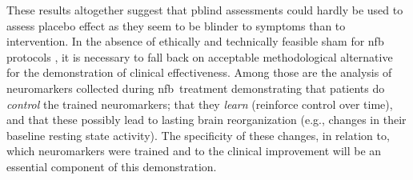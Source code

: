 These results altogether suggest that \gls{pblind} assessments could hardly be used to assess placebo effect as they seem to be blinder 
to symptoms than to intervention. In the absence of ethically \citep{Holtmann2014} and technically \citep{Birbaumer1991} feasible sham 
for \gls{nfb} protocols \citep{World-Medical-Association2000}, it is necessary to fall back on acceptable methodological alternative for 
the demonstration of clinical effectiveness. Among those are the analysis of neuromarkers collected during \gls{nfb} treatment demonstrating 
that patients do \emph{control} the trained neuromarkers; that they \emph{learn} (reinforce control over time), and that these possibly 
lead to lasting brain reorganization (e.g., changes in their baseline resting state activity). The specificity of these changes, in relation 
to, which neuromarkers were trained and to the clinical improvement will be an essential component of this demonstration.  

